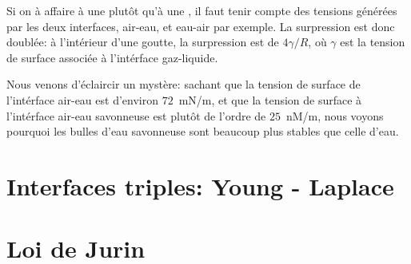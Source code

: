Si on à affaire à une  plutôt qu'à une , il faut tenir compte des tensions générées par les deux interfaces, air-eau, et eau-air par exemple. La surpression est donc doublée: à l'intérieur d'une goutte, la surpression est de $4\gamma/R$, où $\gamma$ est la tension de surface associée à l'intérface gaz-liquide. 

Nous venons d'éclaircir un mystère: sachant que la tension de surface de l'intérface air-eau est d'environ $72$\ mN/m, et que la tension de surface à l'intérface air-eau savonneuse est plutôt de l'ordre de $25$\ nM/m, nous voyons pourquoi les bulles d'eau savonneuse sont beaucoup plus stables que celle d'eau. 

\section{Interfaces triples: Young - Laplace}



\section{Loi de Jurin}


